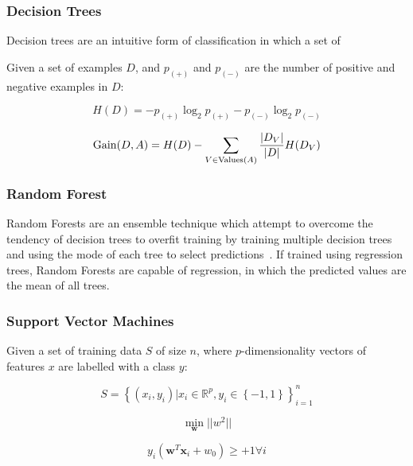 \subsubsection{Decision Trees}

Decision trees are an intuitive form of classification in which a set
of

Given a set of examples $D$, and $p_{(+)}$ and $p_{(-)}$ are the
number of positive and negative examples in $D$:

\begin{equation}
  H(D) = - p_{(+)}\log_2p_{(+)} - p_{(-)}\log_2p_{(-)}
\end{equation}

\begin{equation}
  \operatorname*{Gain}(D, A) = H(D) - \sum_{V \in \text{Values}(A)}\frac{|D_V|}{|D|}H(D_V)
\end{equation}


\subsubsection{Random Forest}

Random Forests are an ensemble technique which attempt to overcome the
tendency of decision trees to overfit training by training multiple
decision trees and using the mode of each tree to select
predictions~\cite{Breiman1999}. If trained using regression trees,
Random Forests are capable of regression, in which the predicted
values are the mean of all trees.


\subsubsection{Support Vector Machines}

Given a set of training data $S$ of size $n$, where $p$-dimensionality
vectors of features $x$ are labelled with a class $y$:

\begin{equation}
  S = \left\{ (x_i,y_i) | x_i \in \mathbb{R}^p, y_i \in \left\{ -1, 1 \right\} \right\}_{i=1}^{n}
\end{equation}

\begin{equation}
  \min_{\bm{w}} || w^2 ||
\end{equation}

\begin{equation}
  y_i(\bm{w}^T\bm{x}_i + w_0) \ge +1 \forall i
\end{equation}


